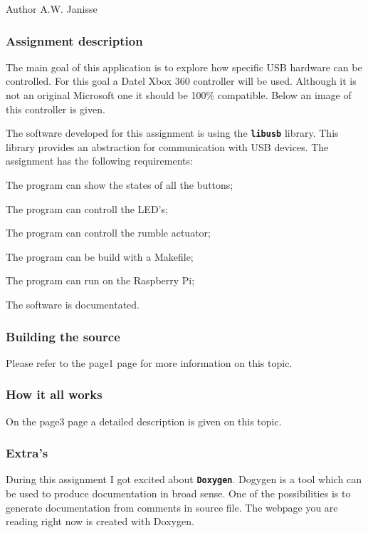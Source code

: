 \begin{DoxyAuthor}{Author}
A.\-W. Janisse \par
\par
 
\end{DoxyAuthor}
\subsubsection*{Assignment description}

The main goal of this application is to explore how specific U\-S\-B hardware can be controlled. For this goal a Datel Xbox 360 controller will be used. Although it is not an original Microsoft one it should be 100\% compatible. Below an image of this controller is given.



The software developed for this assignment is using the {\tt {\bfseries libusb}} library. This library provides an abstraction for communication with U\-S\-B devices. The assignment has the following requirements\-:


\begin{DoxyItemize}
\item The program can show the states of all the buttons; 
\item The program can controll the L\-E\-D's; 
\item The program can controll the rumble actuator; 
\item The program can be build with a Makefile; 
\item The program can run on the Raspberry Pi; 
\item The software is documentated. 
\end{DoxyItemize}

\subsubsection*{Building the source}

Please refer to the page1 page for more information on this topic. 

\subsubsection*{How it all works}

On the page3 page a detailed description is given on this topic. 

\subsubsection*{Extra's}

During this assignment I got excited about {\tt {\bfseries Doxygen}}. Dogygen is a tool which can be used to produce documentation in broad sense. One of the possibilities is to generate documentation from comments in source file. The webpage you are reading right now is created with Doxygen. 